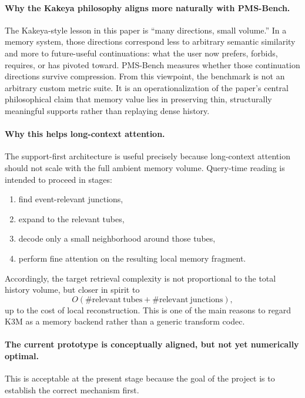 \documentclass[11pt]{article}
\begin{document}
\paragraph{Why the Kakeya philosophy aligns more naturally with PMS-Bench.}
The Kakeya-style lesson in this paper is ``many directions, small volume.'' In a memory system, those directions correspond less to arbitrary semantic similarity and more to future-useful continuations: what the user now prefers, forbids, requires, or has pivoted toward. PMS-Bench measures whether those continuation directions survive compression. From this viewpoint, the benchmark is not an arbitrary custom metric suite. It is an operationalization of the paper's central philosophical claim that memory value lies in preserving thin, structurally meaningful supports rather than replaying dense history.

\paragraph{Why this helps long-context attention.}
The support-first architecture is useful precisely because long-context attention should not scale with the full ambient memory volume. Query-time reading is intended to proceed in stages:
\begin{enumerate}[leftmargin=1.5em]
\item find event-relevant junctions,
\item expand to the relevant tubes,
\item decode only a small neighborhood around those tubes,
\item perform fine attention on the resulting local memory fragment.
\end{enumerate}
Accordingly, the target retrieval complexity is not proportional to the total history volume, but closer in spirit to
\begin{equation}
O(\#\mathrm{relevant\ tubes} + \#\mathrm{relevant\ junctions}),
\end{equation}
up to the cost of local reconstruction. This is one of the main reasons to regard K3M as a memory backend rather than a generic transform codec.

\paragraph{The current prototype is conceptually aligned, but not yet numerically optimal.}
This is acceptable at the present stage because the goal of the project is to establish the correct mechanism first.
\end{document}
